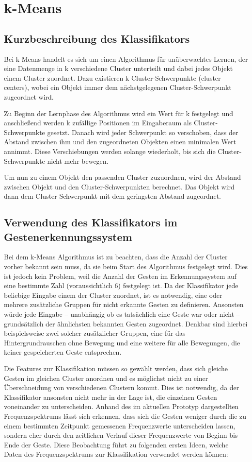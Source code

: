 \section{k-Means}
\subsection{Kurzbeschreibung des Klassifikators}
Bei k-Means handelt es sich um einen Algorithmus für unüberwachtes Lernen, der eine Datenmenge in k verschiedene Cluster unterteilt und dabei jedes Objekt einem Cluster zuordnet. Dazu existieren k Cluster-Schwerpunkte (cluster centers), wobei ein Objekt immer dem nächstgelegenen Cluster-Schwerpunkt zugeordnet wird.

Zu Beginn der Lernphase des Algorithmus wird ein Wert für k festgelegt und anschließend werden k zufällige Positionen im Eingaberaum als Cluster-Schwerpunkte gesetzt. Danach wird jeder Schwerpunkt so verschoben, dass der Abstand zwischen ihm und den zugeordneten Objekten einen minimalen Wert annimmt. Diese Verschiebungen werden solange wiederholt, bis sich die Cluster-Schwerpunkte nicht mehr bewegen.

Um nun zu einem Objekt den passenden Cluster zuzuordnen, wird der Abstand zwischen Objekt und den Cluster-Schwerpunkten berechnet. Das Objekt wird dann dem Cluster-Schwerpunkt mit dem geringsten Abstand zugeordnet.


\subsection{Verwendung des Klassifikators im Gestenerkennungssystem}
Bei dem k-Means Algorithmus ist zu beachten, dass die Anzahl der Cluster vorher bekannt sein muss, da sie beim Start des Algorithmus festgelegt wird. Dies ist jedoch kein Problem, weil die Anzahl der Gesten im Erkennungssystem auf eine bestimmte Zahl (voraussichtlich 6) festgelegt ist. Da der Klassifikator jede beliebige Eingabe einem der Cluster zuordnet, ist es notwendig, eine oder mehrere zusätzliche Gruppen für nicht erkannte Gesten zu definieren. Ansonsten würde jede Eingabe – unabhängig ob es tatsächlich eine Geste war oder nicht – grundsätzlich der ähnlichsten bekannten Gesten zugeordnet. Denkbar sind hierbei beispielsweise zwei solcher zusätzlicher Gruppen, eine für das Hintergrundrauschen ohne Bewegung und eine weitere für alle Bewegungen, die keiner gespeicherten Geste entsprechen.

Die Features zur Klassifikation müssen so gewählt werden, dass sich gleiche Gesten im gleichen Cluster anordnen und es möglichst nicht zu einer Überschneidung von verschiedenen Clustern kommt. Dies ist notwendig, da der Klassifikator ansonsten nicht mehr in der Lage ist, die einzelnen Gesten voneinander zu unterscheiden. Anhand des im aktuellen Prototyp dargestellten Frequenzspektrums lässt sich erkennen, dass sich die Gesten weniger durch die zu einem bestimmten Zeitpunkt gemessenen Frequenzwerte unterscheiden lassen, sondern eher durch den zeitlichen Verlauf dieser Frequenzwerte von Beginn bis Ende der Geste. Diese Beobachtung führt zu folgenden ersten Ideen, welche Daten des Frequenzspektrums zur Klassifikation verwendet werden können:

